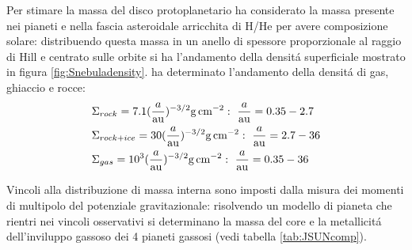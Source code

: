 Per stimare la massa del disco protoplanetario \cite{weidenschilling1977distribution} ha considerato la massa presente nei pianeti e nella fascia asteroidale arricchita di H/He per avere composizione solare: distribuendo questa massa in un anello di spessore proporzionale al raggio di Hill e centrato sulle orbite si ha l'andamento della densit\'a superficiale mostrato in figura \ref{fig:Snebuladensity}. \cite{hayashi1981structure} ha determinato l'andamento della densit\'a di gas, ghiaccio e rocce:
\begin{align}
&\Sigma_{rock}=7.1(\frac{a}{\si{\astronomicalunit}})\expy{-3/2}\si{\gram\per\square\cm}:\ \frac{a}{\si{\astronomicalunit}}=0.35-2.7\\
&\Sigma_{rock+ice}=30(\frac{a}{\si{\astronomicalunit}})\expy{-3/2}\si{\gram\per\square\cm}:\ \frac{a}{\si{\astronomicalunit}}=2.7-36\\
&\Sigma_{gas}=\num{e3}(\frac{a}{\si{\astronomicalunit}})\expy{-3/2}\si{\gram\per\square\cm}:\ \frac{a}{\si{\astronomicalunit}}=0.35-36
\end{align}

\begin{workout}

\end{workout}

Vincoli alla distribuzione di massa interna sono imposti dalla misura dei momenti di multipolo del potenziale gravitazionale: risolvendo un modello di pianeta che rientri nei vincoli osservativi si determinano la massa del core e la metallicit\'a dell'inviluppo gassoso dei 4 pianeti gassosi (vedi  tabella \ref{tab:JSUNcomp}).

